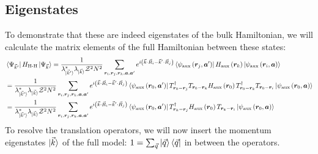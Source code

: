 \subsection{Eigenstates}
To demonstrate that these are indeed eigenstates of the bulk Hamiltonian, we will calculate the matrix elements of the full Hamiltonian between these states:
\begin{equation}\begin{aligned}
	&\bra{\Psi_{\vec k^\prime}}H_\text{H-H} \ket{\Psi_{\vec k}} = \frac{1}{\lambda^*_{\ket{\vec k^\prime}} \lambda_{\ket{\vec k}} \mathcal{Z}^2 N^2}\sum_{{\bm r}_i, {\bm r}_j, {\bm r}_k, {\bm a}, {\bm a}^\prime}e^{i\left(\vec{k}\cdot\vec{R}_i - \vec{k}^\prime\cdot\vec{R}_j\right)} \bra{\psi_\text{aux}\left({\bm r}_j, {\bm a}^\prime\right)} H_\text{aux}\left({\bm r}_k\right) \ket{\psi_\text{aux}\left({\bm r}_i, {\bm a}\right)}\\
	&= \frac{1}{\lambda^*_{\ket{\vec k^\prime}} \lambda_{\ket{\vec k}} \mathcal{Z}^2 N^2}\sum_{{\bm r}_i, {\bm r}_j, {\bm r}_k, {\bm a}, {\bm a}^\prime}e^{i\left(\vec{k}\cdot\vec{R}_i - \vec{k}^\prime\cdot\vec{R}_j\right)} \bra{\psi_\text{aux}\left({\bm r_0}, {\bm a}^\prime\right)} T^\dagger_{{\bm r_0} - {\bm r}_j} T_{{\bm r_0} - {\bm r}_k} H_\text{aux}\left({\bm r_0}\right) T^\dagger_{{\bm r_0} - {\bm r}_k} T_{{\bm r_0} - {\bm r}_i} \ket{\psi_\text{aux}\left({\bm r_0}, {\bm a}\right)}\\
	&= \frac{1}{\lambda^*_{\ket{\vec k^\prime}} \lambda_{\ket{\vec k}} \mathcal{Z}^2 N^2}\sum_{{\bm r}_i, {\bm r}_j, {\bm r}_k, {\bm a}, {\bm a}^\prime}e^{i\left(\vec{k}\cdot\vec{R}_i - \vec{k}^\prime\cdot\vec{R}_j\right)} \bra{\psi_\text{aux}\left({\bm r_0}, {\bm a}^\prime\right)} T^\dagger_{{\bm r}_k - {\bm r}_j} H_\text{aux}\left({\bm r_0}\right) T_{{\bm r}_k - {\bm r}_i} \ket{\psi_\text{aux}\left({\bm r_0}, {\bm a}\right)}
\end{aligned}\end{equation}
To resolve the translation operators, we will now insert the momentum eigenstates \(\ket{\vec k}\) of the full model: \(1 = \sum_{\vec q}\ket{\vec q}\bra{\vec q}\) in between the operators.
